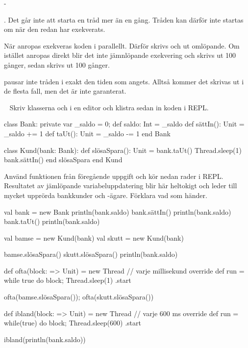 \SOLUTION


\TaskSolved \what

\SubtaskSolved   -

\SubtaskSolved  {}. Det går inte att starta en tråd mer än en gång. Tråden kan därför inte startas om när den redan har exekverats.

\SubtaskSolved   När  anropas exekveras koden i  parallellt. Därför skrivs  och  ut omlöpande. Om istället  anropas direkt blir det inte jämnlöpande exekvering och  skrivs ut 100 gånger, sedan skrivs  ut 100 gånger.

\SubtaskSolved   {} pausar inte tråden i exakt den tiden som angets. Alltså kommer det skrivas ut  i de flesta fall, men det är inte garanterat.



\QUESTEND







\QUESTBEGIN

\Task \label{task:racecondition} \what~   Skriv klasserna  och  i en editor och klistra sedan in koden i REPL.

\begin{Code}
class Bank:
  private var _saldo = 0;
  def saldo: Int = _saldo
  def sättIn(): Unit = _saldo += 1 
  def taUt(): Unit   = _saldo -= 1 
end Bank

class Kund(bank: Bank):
  def slösaSpara(): Unit = 
    bank.taUt()
    Thread.sleep(1)
    bank.sättIn()
  end slösaSpara
end Kund
\end{Code}

\Subtask Använd funktionen  från föregående uppgift och kör nedan rader i REPL. Resultatet av jämlöpande variabeluppdatering blir här heltokigt och leder till mycket upprörda bankkunder och -ägare. Förklara vad som händer.

\begin{REPL}
val bank = new Bank
println(bank.saldo)
bank.sättIn()
println(bank.saldo)
bank.taUt()
println(bank.saldo)

val bamse = new Kund(bank)
val skutt = new Kund(bank)

bamse.slösaSpara()
skutt.slösaSpara()
println(bank.saldo)

def ofta(block: => Unit) = new Thread { // varje millisekund
  override def run = while true do { block;  Thread.sleep(1)} 
}.start

ofta(bamse.slösaSpara()); ofta(skutt.slösaSpara())

def ibland(block: => Unit) = new Thread {  // varje 600 ms
  override def run = while(true) do { block; Thread.sleep(600) }
}.start

ibland(println(bank.saldo))
\end{REPL}


